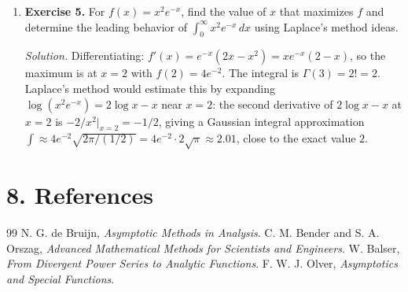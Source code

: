 \begin{enumerate}[leftmargin=*,itemsep=0.9em]
\item \textbf{Exercise 5.} For $f(x)=x^2 e^{-x}$, find the value of $x$ that maximizes $f$ and determine the leading behavior of $\int_0^\infty x^2 e^{-x}\,dx$ using Laplace's method ideas.

\emph{Solution.} Differentiating: $f'(x)=e^{-x}(2x-x^2)=xe^{-x}(2-x)$, so the maximum is at $x=2$ with $f(2)=4e^{-2}$. The integral is $\Gamma(3)=2!=2$. Laplace's method would estimate this by expanding $\log(x^2 e^{-x})=2\log x -x$ near $x=2$: the second derivative of $2\log x -x$ at $x=2$ is $-2/x^2\big|_{x=2}=-1/2$, giving a Gaussian integral approximation $\int\approx 4e^{-2}\sqrt{2\pi/(1/2)}=4e^{-2}\cdot 2\sqrt{\pi}\approx 2.01$, close to the exact value $2$.

\end{enumerate}
\section*{8. References}
\begin{thebibliography}{99}
 N. G. de Bruijn, \emph{Asymptotic Methods in Analysis}.
 C. M. Bender and S. A. Orszag, \emph{Advanced Mathematical Methods for Scientists and Engineers}.
 W. Balser, \emph{From Divergent Power Series to Analytic Functions}.
 F. W. J. Olver, \emph{Asymptotics and Special Functions}.
\end{thebibliography}
